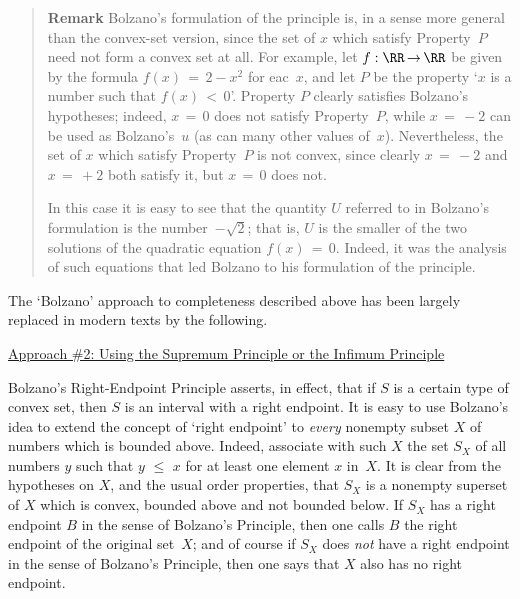 \begin{quotation}
{\V

        {\bf Remark} Bolzano's formulation of the principle is, in a sense more general than the convex-set version,
    since the set of $x$ which satisfy Property~$P$ need not form a convex set at all. For example, let $f:{\RR} \,{\rightarrow}\, {\RR}$
    be given by the formula $f(x) \,=\, 2-x^{2}$ for eac~$x$, and let $P$ be the property `$x$ is a number such that $f(x)\,<\,0$'.
    Property $P$ clearly satisfies Bolzano's hypotheses; indeed, $x \,=\, 0$ does not satisfy Property~$P$,
    while $x \,=\, -2$ can be used as Bolzano's~$u$ (as can many other values of~$x$).
    Nevertheless, the set of $x$ which satisfy Property~$P$ is not convex, since clearly $x \,=\, -2$ and $x \,=\, +2$ both satisfy it, but $x \,=\, 0$ does not.

        In this case it is easy to see that the quantity $U$ referred to in Bolzano's formulation is the number~$-\sqrt{2}$;
    that is, $U$ is the smaller of the two solutions of the quadratic equation $f(x) \,=\, 0$.
    Indeed, it was the analysis of such equations that led Bolzano to his formulation of the principle.
}%
\end{quotation}

\VV

        The `Bolzano' approach to completeness described above has been largely replaced in modern texts by the following.

\VV

        \underline{Approach \#2: Using the Supremum Principle or the Infimum Principle}

\V

       Bolzano's Right-Endpoint Principle asserts, in effect, that if $S$ is a certain type of convex set, then $S$ is an interval with a right endpoint.
    It is easy to use Bolzano's idea to extend the concept of `right endpoint' to {\em every} nonempty subset $X$ of numbers which is bounded above.
    Indeed, associate with such $X$ the set $S_{X}$ of all numbers $y$ such that $y\,\,{\leq}\,\,x$ for at least one element $x$ in~$X$.
    It is clear from the hypotheses on $X$, and the usual order properties, that $S_{X}$
    is a nonempty superset of $X$ which is convex, bounded above and not bounded below.
    If $S_{X}$ has a right endpoint $B$ in the sense of Bolzano's Principle, then one calls $B$ the right endpoint of the original set~$X$;
    and of course if $S_{X}$ does {\em not} have a right endpoint in the sense of Bolzano's Principle, then one says that $X$ also has no right endpoint.


